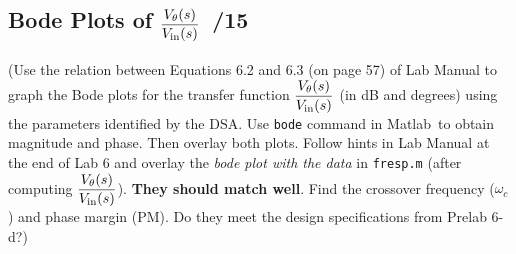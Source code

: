 \documentclass{article}
\newcommand{\score}{\hfill \underline{\hspace{0.65cm}}\,/} %
\newcommand\RR{\textsuperscript{\textregistered}~} %
\begin{document}

\subsection{Bode Plots of $\displaystyle \frac{V_{\theta}(s)}{V_{\rm in}(s)}$ \score 15}
\label{sec:pot_bode}
(Use the relation between Equations 6.2 and 6.3 (on page 57) of Lab Manual to graph the Bode plots for the transfer function $\displaystyle \frac{V_{\theta}(s)}{V_{\rm in}(s)}$ (in dB and degrees) using the parameters identified by the DSA. Use \texttt{bode} command in {\sc Matlab}\RR to obtain magnitude and phase. Then overlay both plots. Follow hints in Lab Manual at the end of Lab 6 and overlay the \emph{bode plot with the data} in \texttt{fresp.m} (after computing $\displaystyle \frac{V_{\theta}(s)}{V_{\rm in}(s)}$). {\bf They should match well}. Find the crossover frequency ($\omega_c$) and phase margin (PM). Do they meet the design specifications from Prelab 6-d?)


\begin{center}
\\[2pt]
\\[2pt]
\end{center}
\end{document}

